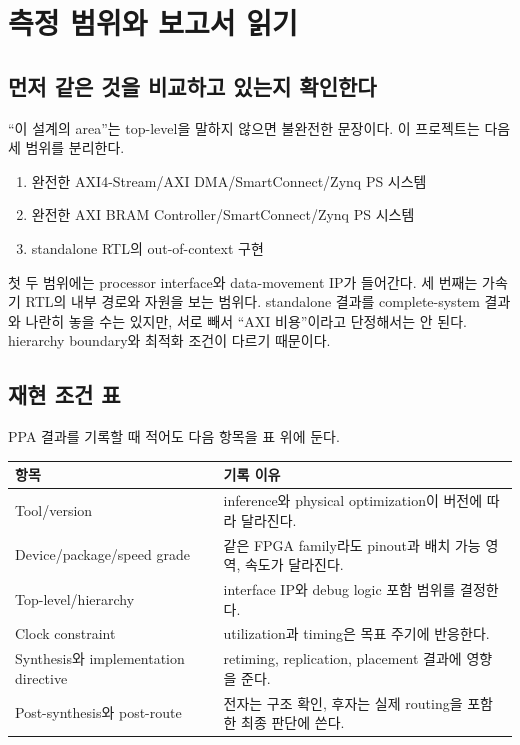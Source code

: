 \chapter{측정 범위와 보고서 읽기}

\section{먼저 같은 것을 비교하고 있는지 확인한다}

``이 설계의 area''는 top-level을 말하지 않으면 불완전한 문장이다. 이 프로젝트는
다음 세 범위를 분리한다.

\begin{enumerate}
  \item 완전한 AXI4-Stream/AXI DMA/SmartConnect/Zynq PS 시스템
  \item 완전한 AXI BRAM Controller/SmartConnect/Zynq PS 시스템
  \item standalone  RTL의 out-of-context 구현
\end{enumerate}

첫 두 범위에는 processor interface와 data-movement IP가 들어간다. 세 번째는
가속기 RTL의 내부 경로와 자원을 보는 범위다. standalone 결과를 complete-system
결과와 나란히 놓을 수는 있지만, 서로 빼서 ``AXI 비용''이라고 단정해서는 안
된다. hierarchy boundary와 최적화 조건이 다르기 때문이다.

\section{재현 조건 표}

PPA 결과를 기록할 때 적어도 다음 항목을 표 위에 둔다.

\begin{longtable}{L{43mm}L{119mm}}
\toprule
항목 & 기록 이유 \\
\midrule
Tool/version & inference와 physical optimization이 버전에 따라 달라진다. \\
Device/package/speed grade & 같은 FPGA family라도 pinout과 배치 가능 영역, 속도가 달라진다. \\
Top-level/hierarchy & interface IP와 debug logic 포함 범위를 결정한다. \\
Clock constraint & utilization과 timing은 목표 주기에 반응한다. \\
Synthesis와 implementation directive & retiming, replication, placement 결과에 영향을 준다. \\
Post-synthesis와 post-route & 전자는 구조 확인, 후자는 실제 routing을 포함한 최종 판단에 쓴다. \\
\bottomrule
\end{longtable}

